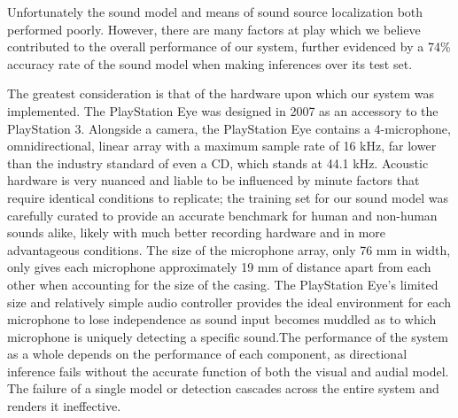 \documentclass{article}
\begin{document}
Unfortunately the sound model and means of sound source localization both performed poorly. However, there are many factors at play which we believe contributed to the overall performance of our system, further evidenced by a 74\% accuracy rate of the sound model when making inferences over its test set.

The greatest consideration is that of the hardware upon which our system was implemented. The PlayStation Eye was designed in 2007 as an accessory to the PlayStation 3. Alongside a camera, the PlayStation Eye contains a 4-microphone, omnidirectional, linear array with a maximum sample rate of 16 kHz, far lower than the industry standard of even a CD, which stands at 44.1 kHz. Acoustic hardware is very nuanced and liable to be influenced by minute factors that require identical conditions to replicate; the training set for our sound model was carefully curated to provide an accurate benchmark for human and non-human sounds alike, likely with much better recording hardware and in more advantageous conditions. The size of the microphone array, only 76 mm in width, only gives each microphone approximately 19 mm of distance apart from each other when accounting for the size of the casing. The PlayStation Eye’s limited size and relatively simple audio controller provides the ideal environment for each microphone to lose independence as sound input becomes muddled as to which microphone is uniquely detecting a specific sound.The performance of the system as a whole depends on the performance of each component, as directional inference fails without the accurate function of both the visual and audial model. The failure of a single model or detection cascades across the entire system and renders it ineffective.
\end{document}
